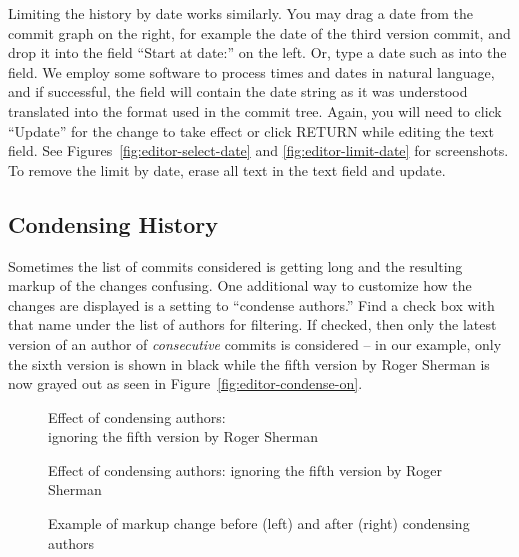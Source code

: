Limiting the history by date works similarly.  You may drag a date from the commit graph on the right, for example the date of the third version commit, and drop it into the field ``Start at date:'' on the left.  Or, type a date such as  into the field.  We employ some software to process times and dates in natural language, and if successful, the field will contain the date string as it was understood translated into the format used in the commit tree.
Again, you will need to click ``Update'' for the change to take effect or click RETURN while editing the text field.  See Figures~\ref{fig:editor-select-date} and \ref{fig:editor-limit-date} for screenshots. To remove the limit by date, erase all text in the text field and update.

\subsection{Condensing History}

Sometimes the list of commits considered is getting long and the resulting markup of the changes confusing.  One additional way to customize how the changes are displayed is a setting to ``condense authors.''  Find a check box with that name under the list of authors for filtering.  If checked, then only the latest version of an author of \textit{consecutive} commits is considered -- in our example, only the sixth version is shown in black while the fifth version by Roger Sherman is now grayed out as seen in Figure~\ref{fig:editor-condense-on}.
\begin{figure}
\centering
  \begin{minipage}[b]{0.57\linewidth}
    \centering
    \ifxetex
      \caption[Effect of condensing authors]{Effect of condensing authors:\\ ignoring the fifth version by Roger Sherman} 
    \else
      \caption[Effect of condensing authors]{Effect of condensing authors: ignoring the fifth version by Roger Sherman} 
    \fi
    \label{fig:editor-condense-on}  
  \end{minipage}  
\hspace{0.04\linewidth}%
  \begin{minipage}[b]{0.38\linewidth}
  \hspace{1em}
    \caption[Example of condensing authors]{Example of markup change before (left) and after (right) condensing authors} \label{fig:editor-condense-before-after}
  \end{minipage}%
\end{figure}

